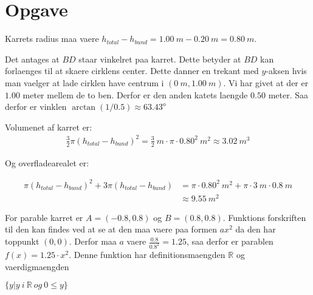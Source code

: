 \documentclass{article}
\begin{document}
\section{Opgave}

Karrets radius maa vaere $h_{total}-h_{bund} = 1.00\ m - 0.20\ m = 0.80\ m$. 

Det antages at $BD$ staar vinkelret paa karret. Dette betyder at $BD$ kan 
forlaenges til at skaere cirklens center. Dette danner en trekant med $y$-aksen
hvis man vaelger at lade cirklen have centrum i $(0\ m,1.00\ m)$. Vi har givet
at der er $1.00$ meter mellem de to ben. Derfor er den anden katets laengde
$0.50$ meter. Saa derfor er vinklen $\arctan(1/0.5) \approx 63.43^o $

Volumenet af karret er:
\begin{align}
\frac{3}{2}\pi{(h_{total}-h_{bund})}^2
= \frac{3}{2}\ m \cdot \pi\cdot 0.80^2\ m^2 \approx 3.02\ m^3
\end{align}

Og overfladearealet er:

\begin{align}
	\pi{(h_{total}-h_{bund})}^2 + 3\pi(h_{total}-h_{bund}) 
	&= \pi \cdot 0.80^2\ m^2 + \pi \cdot 3\ m \cdot 0.8\ m \\
	&\approx 9.55\ m^2 \nonumber
\end{align}

For parable karret er $A = (-0.8, 0.8)$ og $B = (0.8, 0.8)$.
Funktions forskriften til den kan findes ved at se at den maa vaere paa formen
$ax^2$ da den har toppunkt $(0, 0)$. Derfor maa $a$ vaere $\frac{0.8}{0.8^2} =
1.25$, saa derfor er parablen $f(x) = 1.25 \cdot x^2$. Denne funktion har
definitionsmaengden $\mathbb{R}$ og vaerdigmaengden 

$\{y|y\ i\ \mathbb{R}\ og\ 0 \leq y\}$
\end{document}
